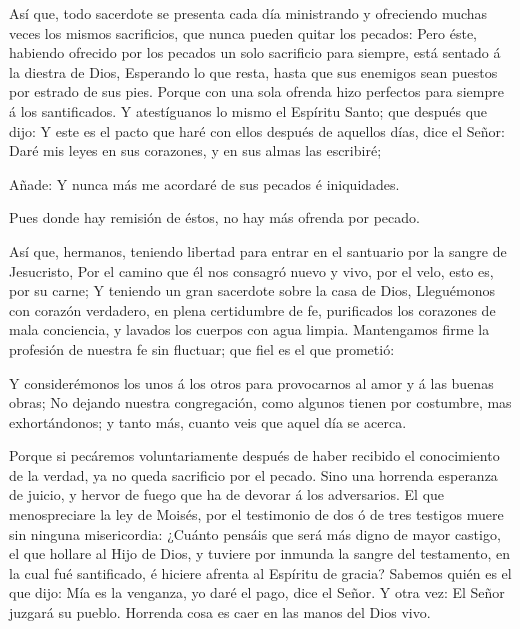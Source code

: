  Así que, todo sacerdote se presenta cada día ministrando y
ofreciendo muchas veces los mismos sacrificios, que nunca pueden quitar
los pecados:  Pero éste, habiendo ofrecido por los pecados
un solo sacrificio para siempre, está sentado á la diestra de Dios,
 Esperando lo que resta, hasta que sus enemigos sean
puestos por estrado de sus pies.  Porque con una sola
ofrenda hizo perfectos para siempre á los santificados.  Y
atestíguanos lo mismo el Espíritu Santo; que después que dijo:
 Y este es el pacto que haré con ellos después de aquellos
días, dice el Señor: Daré mis leyes en sus corazones, y en sus almas las
escribiré;

 Añade: Y nunca más me acordaré de sus pecados é
iniquidades.

 Pues donde hay remisión de éstos, no hay más ofrenda por
pecado.

 Así que, hermanos, teniendo libertad para entrar en el
santuario por la sangre de Jesucristo,  Por el camino que
él nos consagró nuevo y vivo, por el velo, esto es, por su carne;
 Y teniendo un gran sacerdote sobre la casa de Dios,
 Lleguémonos con corazón verdadero, en plena certidumbre de
fe, purificados los corazones de mala conciencia, y lavados los cuerpos
con agua limpia.  Mantengamos firme la profesión de nuestra
fe sin fluctuar; que fiel es el que prometió:

 Y considerémonos los unos á los otros para provocarnos al
amor y á las buenas obras;  No dejando nuestra
congregación, como algunos tienen por costumbre, mas exhortándonos; y
tanto más, cuanto veis que aquel día se acerca.

 Porque si pecáremos voluntariamente después de haber
recibido el conocimiento de la verdad, ya no queda sacrificio por el
pecado.  Sino una horrenda esperanza de juicio, y hervor de
fuego que ha de devorar á los adversarios.  El que
menospreciare la ley de Moisés, por el testimonio de dos ó de tres
testigos muere sin ninguna misericordia:  ¿Cuánto pensáis
que será más digno de mayor castigo, el que hollare al Hijo de Dios, y
tuviere por inmunda la sangre del testamento, en la cual fué
santificado, é hiciere afrenta al Espíritu de gracia? 
Sabemos quién es el que dijo: Mía es la venganza, yo daré el pago, dice
el Señor. Y otra vez: El Señor juzgará su pueblo.  Horrenda
cosa es caer en las manos del Dios vivo.

